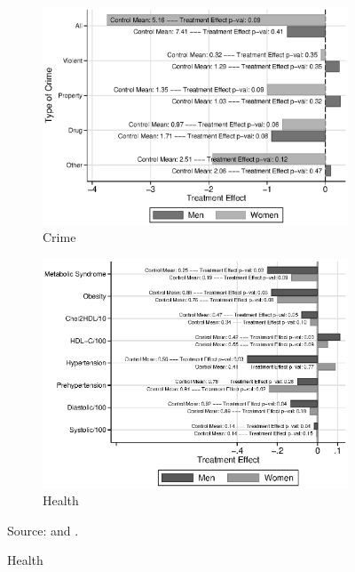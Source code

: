 \begin{figure}
\centering
\caption{Treatment Effects of ABC and CARE}\label{fig:labor-income-profiles}
\begin{subfigure}[h]{0.5\textwidth}
		\centering
		\caption{Crime} \label{fig:crime}
		\includegraphics[width=\textwidth]{output/abc-crime-tes-bygender2}
\end{subfigure}%
\begin{subfigure}[h]{0.5\textwidth}
		\centering
		\caption{Health} \label{fig:health}
		\includegraphics[width=\textwidth]{output/healthtes}
\end{subfigure}
\footnotesize \justify
\item Source: \citet{Garcia_etal_2019_ECE_IMHJ} and \citet{Garcia_Heckman_2019_Early_HE}. 
\end{figure}

